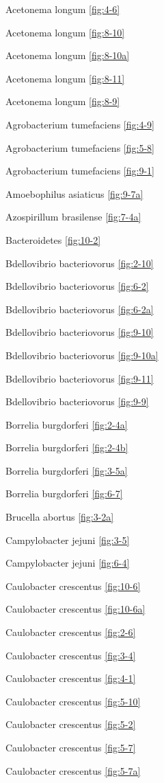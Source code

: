 \documentclass[]{tufte-book}
\begin{document}
Acetonema longum \ref{fig:4-6}

Acetonema longum \ref{fig:8-10}

Acetonema longum \ref{fig:8-10a}

Acetonema longum \ref{fig:8-11}

Acetonema longum \ref{fig:8-9}

Agrobacterium tumefaciens \ref{fig:4-9}

Agrobacterium tumefaciens \ref{fig:5-8}

Agrobacterium tumefaciens \ref{fig:9-1}

Amoebophilus asiaticus \ref{fig:9-7a}

Azospirillum brasilense \ref{fig:7-4a}

Bacteroidetes \ref{fig:10-2}

Bdellovibrio bacteriovorus \ref{fig:2-10}

Bdellovibrio bacteriovorus \ref{fig:6-2}

Bdellovibrio bacteriovorus \ref{fig:6-2a}

Bdellovibrio bacteriovorus \ref{fig:9-10}

Bdellovibrio bacteriovorus \ref{fig:9-10a}

Bdellovibrio bacteriovorus \ref{fig:9-11}

Bdellovibrio bacteriovorus \ref{fig:9-9}

Borrelia burgdorferi \ref{fig:2-4a}

Borrelia burgdorferi \ref{fig:2-4b}

Borrelia burgdorferi \ref{fig:3-5a}

Borrelia burgdorferi \ref{fig:6-7}

Brucella abortus \ref{fig:3-2a}

Campylobacter jejuni \ref{fig:3-5}

Campylobacter jejuni \ref{fig:6-4}

Caulobacter crescentus \ref{fig:10-6}

Caulobacter crescentus \ref{fig:10-6a}

Caulobacter crescentus \ref{fig:2-6}

Caulobacter crescentus \ref{fig:3-4}

Caulobacter crescentus \ref{fig:4-1}

Caulobacter crescentus \ref{fig:5-10}

Caulobacter crescentus \ref{fig:5-2}

Caulobacter crescentus \ref{fig:5-7}

Caulobacter crescentus \ref{fig:5-7a}
\end{document}
